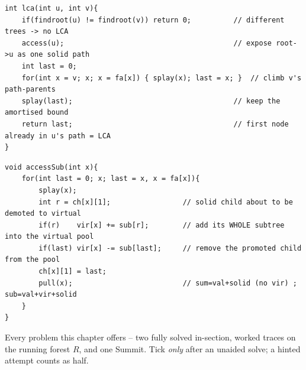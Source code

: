 \begin{lstlisting}[caption={Drill 4 -- the two-access LCA on a rooted forest (from lst:c23-dynalca)}]
int lca(int u, int v){
    if(findroot(u) != findroot(v)) return 0;          // different trees -> no LCA
    access(u);                                        // expose root->u as one solid path
    int last = 0;
    for(int x = v; x; x = fa[x]) { splay(x); last = x; }  // climb v's path-parents
    splay(last);                                      // keep the amortised bound
    return last;                                      // first node already in u's path = LCA
}
\end{lstlisting}

\begin{lstlisting}[caption={Drill 5 -- subtree fold via the vir sibling in access (from lst:c23-subtree)}]
void accessSub(int x){
    for(int last = 0; x; last = x, x = fa[x]){
        splay(x);
        int r = ch[x][1];                 // solid child about to be demoted to virtual
        if(r)    vir[x] += sub[r];        // add its WHOLE subtree into the virtual pool
        if(last) vir[x] -= sub[last];     // remove the promoted child from the pool
        ch[x][1] = last;
        pull(x);                          // sum=val+solid (no vir) ; sub=val+vir+solid
    }
}
\end{lstlisting}



Every problem this chapter offers -- two fully solved in-section, worked traces on the running
forest \(R\), and one Summit. Tick \emph{only} after an unaided solve; a hinted attempt counts as half.


